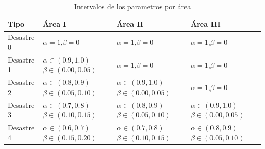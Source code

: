 \begin{table}[H]
\centering
\begin{tabular}{|l|l|l|l|}
\hline
Tipo & Área I & Área II & Área III \\ \hline
Desastre 0 & $\alpha=1$,$\beta=0$ & $\alpha=1$,$\beta=0$ & $\alpha=1$,$\beta=0$ \\ \hline
Desastre 1 & $\alpha \in (0.9,1.0)$ $\beta \in (0.00,0.05)$ & $\alpha=1$,$\beta=0$ & $\alpha=1$,$\beta=0$ \\ \hline
Desastre 2 & $\alpha \in (0.8,0.9)$ $\beta \in (0.05,0.10)$ & $\alpha \in (0.9,1.0)$ $\beta \in (0.00,0.05)$ & $\alpha=1$,$\beta=0$ \\ \hline
Desastre 3 & $\alpha \in (0.7,0.8)$ $\beta \in (0.10,0.15)$ & $\alpha \in (0.8,0.9)$ $\beta \in (0.05,0.10)$ & $\alpha \in (0.9,1.0)$ $\beta \in (0.00,0.05)$ \\ \hline
Desastre 4 & $\alpha \in (0.6,0.7)$ $\beta \in (0.15,0.20)$ & $\alpha \in (0.7,0.8)$ $\beta \in (0.10,0.15)$ & $\alpha \in (0.8,0.9)$ $\beta \in (0.05,0.10)$ \\ \hline
\end{tabular}
\caption{Intervalos de los parametros por área}\label{table:intervalo}
\end{table}




